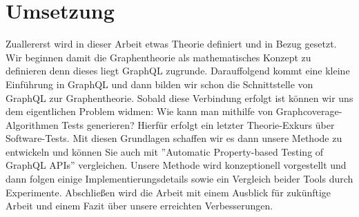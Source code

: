 \section{Umsetzung}

Zuallererst wird in dieser Arbeit etwas Theorie definiert und in Bezug gesetzt.
Wir beginnen damit die Graphentheorie als mathematisches Konzept zu definieren denn dieses liegt GraphQL zugrunde.
Darauffolgend kommt eine kleine Einführung in GraphQL und dann bilden wir schon die Schnittstelle von GraphQL zur Graphentheorie.
Sobald diese Verbindung erfolgt ist können wir uns dem eigentlichen Problem widmen: Wie kann man mithilfe von Graphcoverage-Algorithmen
Tests generieren?
Hierfür erfolgt ein letzter Theorie-Exkurs über Software-Tests.
Mit diesen Grundlagen schaffen wir es dann unsere Methode zu entwickeln und können Sie auch mit ''Automatic Property-based Testing of GraphQL APIs''\cite{property-based-testing}
vergleichen.
Unsere Methode wird konzeptionell vorgestellt und dann folgen einige Implementierungsdetails sowie ein Vergleich beider Tools durch Experimente.
Abschließen wird die Arbeit mit einem Ausblick für zukünftige Arbeit und einem Fazit über unsere erreichten Verbesserungen.